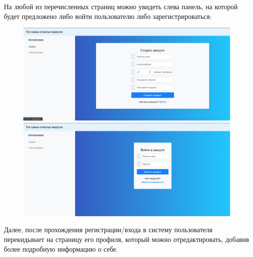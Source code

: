 \documentclass[a4paper,14pt]{extarticle}
\begin{document}
 	\newpage
 
 	На любой из перечисленных страниц можно увидеть слева панель, на которой будет предложено либо войти пользователю либо зарегистрироваться:
 
	 \begin{figure}[h!]
	 	\begin{minipage}[b]{0.45\textwidth}
	 		\includegraphics[width=\textwidth]{examples/register.png}
	 	\end{minipage}
	 	\begin{minipage}[b]{0.45\textwidth}
	 		\includegraphics[width=\textwidth]{examples/login.png}
	 	\end{minipage}
	 	\label{ris:register_login}
	 \end{figure}
 
 	Далее, после прохождения регистрации/входа в систему пользователя перекидывает на страницу его профиля, который можно отредактировать, добавив более подробную информацию о себе.
 	
\end{document}
